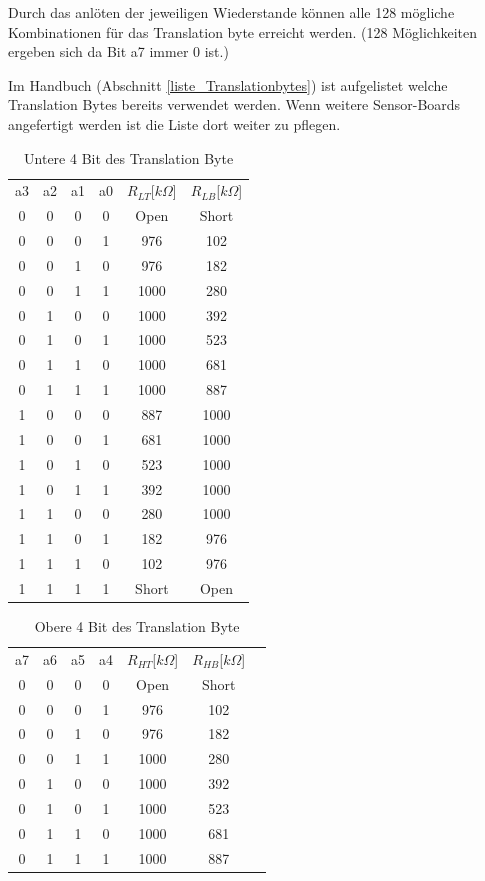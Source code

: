 \noindent Durch das anlöten der jeweiligen Wiederstande können alle 128 mögliche Kombinationen für das Translation byte erreicht werden. (128 Möglichkeiten ergeben sich da Bit a7 immer 0 ist.) 


\noindent Im Handbuch (Abschnitt \ref{liste_Translationbytes}) ist aufgelistet welche Translation Bytes bereits verwendet werden. Wenn weitere Sensor-Boards angefertigt werden ist die Liste dort weiter zu pflegen.

\begin{table}[!ht]
\caption{Untere 4 Bit des Translation Byte}
\label{TranslationByte_Lower}
\centering
\begin{tabular}{c|c|c|c|c|c}
 a3 & a2 & a1 & a0 & $R_{LT}$[$k\Omega$] & $R_{LB}$[$k\Omega$]\\
 0 & 0 & 0 & 0 & Open & Short \\ 
 0 & 0 & 0 & 1 & 976 & 102\\ 
 0 & 0 & 1 & 0 & 976 & 182\\
 0 & 0 & 1 & 1 & 1000 & 280\\ 
 0 & 1 & 0 & 0 & 1000 & 392\\ 
 0 & 1 & 0 & 1 & 1000 & 523\\ 
 0 & 1 & 1 & 0 & 1000 & 681\\ 
 0 & 1 & 1 & 1 & 1000 & 887\\
 1 & 0 & 0 & 0 & 887 & 1000 \\ 
 1 & 0 & 0 & 1 & 681 & 1000\\ 
 1 & 0 & 1 & 0 & 523 & 1000\\
 1 & 0 & 1 & 1 & 392 & 1000\\ 
 1 & 1 & 0 & 0 & 280 & 1000\\ 
 1 & 1 & 0 & 1 & 182 & 976 \\ 
 1 & 1 & 1 & 0 & 102 & 976\\ 
 1 & 1 & 1 & 1 & Short & Open\\
\end{tabular}
\end{table}

\begin{table}[H]
\caption{Obere 4 Bit des Translation Byte}
\label{TranslationByte_Upper}
\centering
\begin{tabular}{c|c|c|c|c|c|c}
 a7 & a6 & a5 & a4 & $R_{HT}$[$k\Omega$] & $R_{HB}$[$k\Omega$]\\
 0 & 0 & 0 & 0 & Open & Short \\ 
 0 & 0 & 0 & 1 & 976 & 102\\ 
 0 & 0 & 1 & 0 & 976 & 182\\
 0 & 0 & 1 & 1 & 1000 & 280\\ 
 0 & 1 & 0 & 0 & 1000 & 392\\ 
 0 & 1 & 0 & 1 & 1000 & 523\\ 
 0 & 1 & 1 & 0 & 1000 & 681\\ 
 0 & 1 & 1 & 1 & 1000 & 887\\

\end{tabular}
\end{table}

